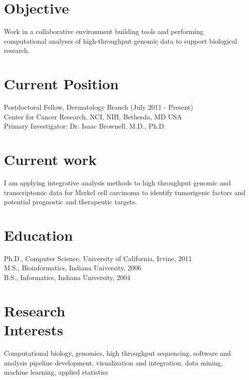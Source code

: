 \documentclass[margin,line]{res}
\begin{document}

\address{\textbf{E-mail:} kenny@kennydaily.net \textbf{Web:} www.kennydaily.net}
\address{10301 Grosvenor Place Apt 703, North Bethesda, MD 20852}

\begin{resume}


\section{Objective}
Work in a collaborative environment building tools and performing computational analyses of high-throughput genomic data to support biological research.

\section{Current Position}
Postdoctoral Fellow, Dermatology Branch  (July 2011 - Present)\\
Center for Cancer Research, NCI, NIH, Bethesda, MD USA \\
Primary Investigator: Dr. Isaac Brownell, M.D., Ph.D.

\section{Current work}
I am applying integrative analysis methods to high throughput genomic and transcriptomic data for Merkel cell carcinoma to identify tumorigenic factors and potential prognostic and therapeutic targets.

\section{Education}
Ph.D., Computer Science, University of California, Irvine, 2011\\%
M.S., Bioinformatics, Indiana University, 2006\\%
B.S., Informatics, Indiana University, 2004%

\section{Research\\Interests}
Computational biology, genomics, high throughput sequencing, software and analysis pipeline development, visualization and integration, data mining, machine learning, applied statistics


\end{resume}
\end{document}
